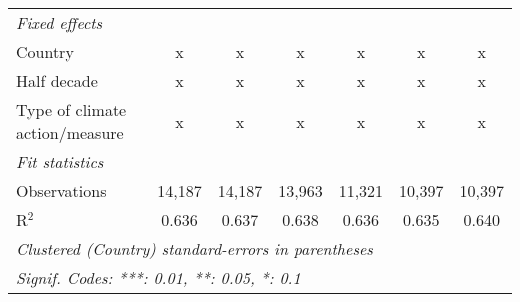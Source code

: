 \begin{tabular}{lcccccc}
   \emph{Fixed effects}\\
   Country                                            & x       & x       & x       & x              & x             & x\\  
   Half decade                                        & x       & x       & x       & x              & x             & x\\  
   Type of climate action/measure                     & x       & x       & x       & x              & x             & x\\  
   \midrule \emph{Fit statistics}\\
   Observations                                       & 14,187  & 14,187  & 13,963  & 11,321         & 10,397        & 10,397\\  
   R$^2$                                              & 0.636   & 0.637   & 0.638   & 0.636          & 0.635         & 0.640\\  
   \midrule
   \multicolumn{7}{l}{\emph{Clustered (Country) standard-errors in parentheses}}\\
   \multicolumn{7}{l}{\emph{Signif. Codes: ***: 0.01, **: 0.05, *: 0.1}}\\
\end{tabular}
\par\endgroup


